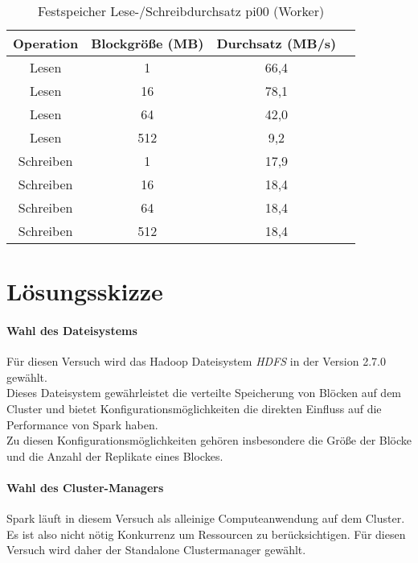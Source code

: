 \begin{table}[ht]
	\centering %
	\begin{tabular}{c c c c} %
	\hline\hline %
	Operation & Blockgröße (MB) & Durchsatz (MB/s) \\ [0.5ex] %
	\hline %
	Lesen & 1 & 66,4 \\ 
	Lesen & 16 & 78,1 \\
	Lesen & 64 & 42,0 \\
	Lesen & 512 & 9,2 \\
	Schreiben & 1 & 17,9 \\ 
	Schreiben & 16 & 18,4 \\
	Schreiben & 64 & 18,4 \\
	Schreiben & 512 & 18,4 \\[1ex] 
	\hline %
	\end{tabular}
	\caption{Festspeicher Lese-/Schreibdurchsatz pi00 (Worker)} %
	\label{table:worker_harddrive} %
\end{table}

\section{Lösungsskizze}
\paragraph{Wahl des Dateisystems}

Für diesen Versuch wird das Hadoop Dateisystem \textit{HDFS} in der Version 2.7.0 gewählt.\\

Dieses Dateisystem gewährleistet die verteilte Speicherung von Blöcken auf dem Cluster und bietet Konfigurationsmöglichkeiten die direkten Einfluss auf die Performance von Spark haben.\\

Zu diesen Konfigurationsmöglichkeiten gehören insbesondere die Größe der Blöcke und die Anzahl der Replikate eines Blockes.\\

\paragraph{Wahl des Cluster-Managers}

Spark läuft in diesem Versuch als alleinige Computeanwendung auf dem Cluster. Es ist also nicht nötig Konkurrenz um Ressourcen zu berücksichtigen. Für diesen Versuch wird daher der Standalone Clustermanager gewählt.\\

